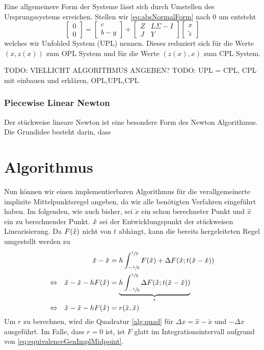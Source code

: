 Eine allgemeinere Form der Systeme lässt sich durch Umstellen des Ursprungssystems erreichen. Stellen wir \eqref{eq:absNormalForm} nach $0$ um entsteht
 \begin{equation}
\label{eq:UPL}
  \begin{bmatrix}
   0\\0
  \end{bmatrix}
  =
  \begin{bmatrix}
   c\\b -y
  \end{bmatrix}
  +
  \begin{bmatrix}
   Z & L\Sigma - I \\
   J & Y
  \end{bmatrix}
  \begin{bmatrix}
   x\\ \tilde z
  \end{bmatrix}
 \end{equation}
welches wir Unfolded System (UPL) nennen. Dieses reduziert sich für die Werte $(x,z(x))$ zum OPL System und für die Werte $(z(x),x)$ zum CPL System.


TODO: VIELLICHT ALGORITHMUS ANGEBEN?
TODO: UPL = CPL, CPL mit einbauen und erklären, OPL,UPL,CPL
\subsubsection{Piecewise Linear Newton}
Der stückweise lineare Newton ist eine besondere Form des Newton Algorithmus. Die Grundidee besteht darin, dass 
\section{Algorithmus}
Nun können wir einen implementierbaren Algorithmus für die verallgemeinerte implizite Mittelpunktsregel angeben, da wir alle benötigten Verfahren eingeführt haben. Im folgenden, wie auch bisher, sei $\check x$ ein schon berechneter Punkt und $\hat x$ ein zu berechnender Punkt. $\mathring{x}$ sei der Entwicklungspunkt der stückweisen Linearisierung. Da $F(\mathring{x})$ nicht von $t$ abhängt, kann die bereits hergeleiteten Regel umgestellt werden zu 
\begin{equation}
\label{eq:genMidpointAlg}
\begin{aligned}
 && \hat x - \check x &= h\int_{-\sfrac{1}{2}}^{\sfrac{1}{2}}F(\mathring{x})+ \Delta F(\mathring{x};t(\hat x - \check x)) \\
 \Leftrightarrow && \hat x - \check x - hF(\mathring{x}) & =\underbrace{h \int_{-\sfrac{1}{2}}^{\sfrac{1}{2}} \Delta F(\mathring{x};t(\hat x - \check x))}_{r} \\
 \Leftrightarrow && \hat x - \check x - hF(\mathring{x}) & =r(\hat x,\check x)
\end{aligned}
\end{equation}
Um $r$ zu berechnen, wird die Quadratur \ref{alg:quad} für $\Delta x = \hat x - \check x$ und $-\Delta x$ ausgeführt. Im Falle, dass $r=0$ ist, ist $F$ glatt im Integrationsintervall aufgrund von \eqref{eq:equivalenceGenImplMidpoint}.

